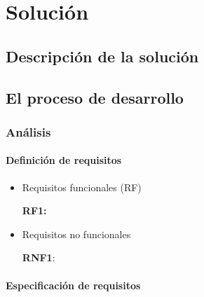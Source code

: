 \documentclass[12pt,a4paper,onecolumn,oneside]{report}
\begin{document}
\chapter{Solución}
\label{Solución}

\section{Descripción de la solución}


\section{El proceso de desarrollo}

\subsection{Análisis}
\label{analisis}


\subsubsection{Definición de requisitos}

\begin{itemize}
    \item Requisitos funcionales (RF)

           \textbf{RF1: }
           
           
    \item Requisitos no funcionales

    \textbf{RNF1}: 
\end{itemize}

\subsubsection{Especificación de requisitos}
\end{document}
